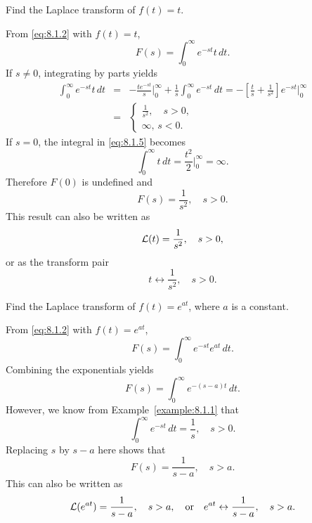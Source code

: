 \documentclass{ximera}
\begin{document}
\begin{example}\label{example:8.1.2}
 Find the Laplace transform of $f(t)=t$.
\begin{explanation}
  From  \eqref{eq:8.1.2} with $f(t)=t$,
\begin{equation}\label{eq:8.1.5}
F(s)=\int_0^\infty e^{-st}t\,dt.
\end{equation}
If $s\neq 0$,  integrating by parts yields
\begin{eqnarray*}
\int_0^\infty e^{-st}t\,dt&=&-\frac{te^{-st}}{s}\bigg|_0^\infty
+\frac{1}{s}\int_0^\infty e^{-st}\,dt
=-\left[\frac{t}{s}+\frac{1}{s^2}\right]e^{-st}\bigg|_0^\infty
\\&=&\left\{\begin{array}{rr}\frac{1}{s^2},\quad s>0,\\
\infty,\,s<0.\end{array}\right.
\end{eqnarray*}
If $s=0$, the integral in  \eqref{eq:8.1.5} becomes
$$
\int_0^\infty t\,dt=\frac{t^2}{2}\bigg|_0^\infty=\infty.
$$
Therefore $F(0)$ is undefined and
$$
F(s)=\frac{1}{s^2},\quad s>0.
$$
This result can also be written as
$$
{\cal L}(t)=\frac{1}{s^2},\quad s>0,
$$
or as the transform pair
$$
t\leftrightarrow\frac{1}{s^2},\quad s>0.
$$
\end{explanation}
\end{example}

\begin{example}\label{example:8.1.3}
 Find the Laplace transform of $f(t)=e^{at}$, where $a$ is a constant.
\begin{explanation}
From  \eqref{eq:8.1.2} with $f(t)=e^{at}$,
$$
F(s)=\int_0^\infty e^{-st}e^{at}\,dt.
$$
Combining the exponentials yields
$$
F(s)=\int_0^\infty e^{-(s-a)t}\,dt.
$$
However, we know from Example~\ref{example:8.1.1}  that
$$
\int_0^\infty e^{-st}\,dt=\frac{1}{s},\quad s>0.
$$
Replacing $s$ by $s-a$ here shows that
$$
F(s)=\frac{1}{s-a},\quad s>a.
$$
This can also be written as
$$
{\cal L}(e^{at})=\frac{1}{s-a},\quad s>a, \quad\text{or}\quad
 e^{at}\leftrightarrow\frac{1}{s-a},\quad s>a.
$$
\end{explanation}
\end{example}
\end{document}
